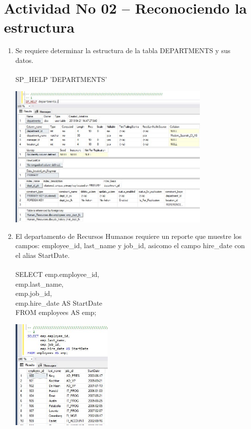 \section{Actividad No 02 – Reconociendo la estructura} 

\begin{enumerate}[1.]
	\item Se requiere determinar la estructura de la tabla DEPARTMENTS y sus datos.
	\\
	\\SP\_HELP 'DEPARTMENTS'

	\begin{center}
	\includegraphics[width=10cm]{./Imagenes/actividad0201} 
	\end{center}

	\item El departamento de Recursos Humanos requiere un reporte que muestre los campos: employee\_id, last\_name y job\_id, asicomo el campo hire\_date con el alias StartDate.
	\\
	\\SELECT emp.employee\_id, \\
	emp.last\_name, \\
	emp.job\_id, \\
	emp.hire\_date AS StartDate \\
	FROM employees AS emp; 

	\begin{center}
	\includegraphics[width=5cm]{./Imagenes/actividad0202} 
	\end{center}


\end{enumerate}
